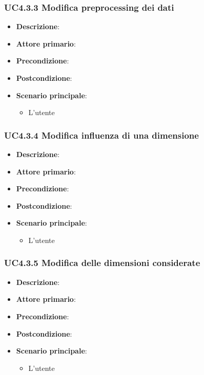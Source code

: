 \subsubsection{UC4.3.3 Modifica preprocessing dei dati}
\label{ssub:uc4.3.3}
\begin{itemize}
    \item \textbf{Descrizione}:
    \item \textbf{Attore primario}:
    \item \textbf{Precondizione}:
    \item \textbf{Postcondizione}:
    \item \textbf{Scenario principale}:
    \begin{itemize}
        \item L'utente
    \end{itemize}
\end{itemize}

\subsubsection{UC4.3.4 Modifica influenza di una dimensione}
\label{ssub:uc4.3.4}
\begin{itemize}
    \item \textbf{Descrizione}:
    \item \textbf{Attore primario}:
    \item \textbf{Precondizione}:
    \item \textbf{Postcondizione}:
    \item \textbf{Scenario principale}:
    \begin{itemize}
        \item L'utente
    \end{itemize}
\end{itemize}

\subsubsection{UC4.3.5 Modifica delle dimensioni considerate}
\label{ssub:uc4.3.5}
\begin{itemize}
    \item \textbf{Descrizione}:
    \item \textbf{Attore primario}:
    \item \textbf{Precondizione}:
    \item \textbf{Postcondizione}:
    \item \textbf{Scenario principale}:
    \begin{itemize}
        \item L'utente
    \end{itemize}
\end{itemize}

